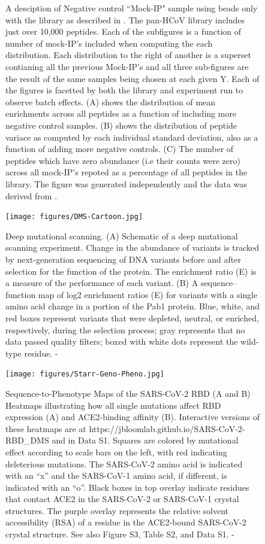 \documentclass{article}
\begin{document}
\begin{figure}
    \caption{A desciption of Negative control ``Mock-IP" sample using beads only with the library as described in \citet{Stoddard2020}. The pan-HCoV library includes just over 10,000 peptides. Each of the subfigures is a function of number of mock-IP's included when computing the each distribution. Each distribution to the right of another is a superset contianing all the previous Mock-IP's and all three sub-figures are the result of the same samples being chosen at each given Y. Each of the figures is facetted by both the library and experiment run to observe batch effects. (A) shows the distribution of mean enrichments across all peptides as a function of including more negative control samples. (B) shows the distribution of peptide variace as computed by each individual standard deviation, also as a function of adding more negative controls. (C) The number of peptides which have zero abundance (i.e their counts were zero) across all mock-IP's repoted as a percentage of all peptides in the library. The figure was generated independently and the data was derived from \citet{Stoddard2020}.} 
\label{fig:Mock-IP}
\end{figure}

\begin{figure}[h]
\centering
\texttt{[image: figures/DMS-Cartoon.jpg]}
    \caption{Deep mutational scanning. (A) Schematic of a deep mutational scanning experiment. Change in the abundance of variants is tracked by next-generation sequencing of DNA variants before and after selection for the function of the protein. The enrichment ratio (E) is a measure of the performance of each variant. (B) A sequence–function map of log2 enrichment ratios (E) for variants with a single amino acid change in a portion of the Pab1 protein. Blue, white, and red boxes represent variants that were depleted, neutral, or enriched, respectively, during the selection process; gray represents that no data passed quality filters; boxed with white dots represent the wild-type residue. - \citep{Starita2015}}
\label{fig:DMS-Cartoon}
\end{figure}

\begin{figure}[h]
\centering
\texttt{[image: figures/Starr-Geno-Pheno.jpg]}
    \caption{Sequence-to-Phenotype Maps of the SARS-CoV-2 RBD (A and B) Heatmaps illustrating how all single mutations affect RBD expression (A) and ACE2-binding affinity (B). Interactive versions of these heatmaps are at https://jbloomlab.github.io/SARS-CoV-2-RBD\_DMS and in Data S1. Squares are colored by mutational effect according to scale bars on the left, with red indicating deleterious mutations. The SARS-CoV-2 amino acid is indicated with an “x” and the SARS-CoV-1 amino acid, if different, is indicated with an “o”. Black boxes in top overlay indicate residues that contact ACE2 in the SARS-CoV-2 or SARS-CoV-1 crystal structures. The purple overlay represents the relative solvent accessibility (RSA) of a residue in the ACE2-bound SARS-CoV-2 crystal structure. See also Figure S3, Table S2, and Data S1. - \citep{Starr2020}}
\label{fig:Starr-Geno-Pheno}
\end{figure}
\end{document}
